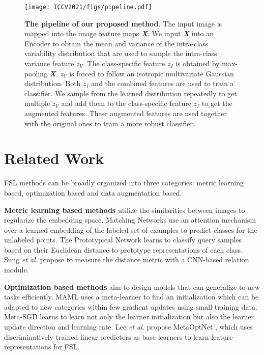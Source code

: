 \documentclass[10pt,twocolumn,letterpaper]{article}
\begin{document}
\begin{figure*}[!t]
  \centering
  \texttt{[image: ICCV2021/figs/pipeline.pdf]}\\
   \caption{\textbf{The pipeline of our proposed method}. The input image is mapped into the image feature maps \textbf{\textit{X}}. We input \textbf{\textit{X}} into an Encoder to obtain the mean and variance of the intra-class variability distribution that are used to sample the intra-class variance feature $z_V$. The class-specific feature $z_I$ is obtained by max-pooling \textbf{\textit{X}}. $z_V$ is forced to follow an isotropic multivariate Gaussian distribution. Both $z_I$ and the combined features are used to train a classifier.
We sample from the learned distribution repeatedly to get multiple $z_V$ and add them to the class-specific feature $z_I$ to get the augmented features.
These augmented features are used together with the original ones to train a more robust classifier.
  }
  \label{fig:pipeline}
\end{figure*}
\section{Related Work}

FSL methods can be broadly organized into three categories: metric learning based, optimization based and data augmentation based.
      
      \textbf{Metric learning based methods} \cite{matchingnet,protonet,relationnet,Ye2020FewShotLV,Yang2021FreeLF,Tian2020RethinkingFI,Zhang2020DeepEMDFI} utilize the similarities between images to regularize the embedding space. Matching Networks \cite{matchingnet} use an attention mechanism over a learned embedding of the labeled set of examples to predict classes for the unlabeled points.
The Prototypical Network \cite{protonet} learns to classify query samples based on their Euclidean distance to prototype representations of each class.
Sung \textit{et al.} \cite{relationnet} propose to measure the distance metric with a CNN-based relation module.


      \textbf{Optimization based methods} \cite{maml,metasgd,meta-opt,Lifchitz2019DenseCA,Santoro2016MetaLearningWM,Rajeswaran2019MetaLearningWI,Scott2018AdaptedDE} aim to design models that can generalize to new tasks efficiently.
MAML \cite{maml} uses a meta-learner to find an initialization which can be adapted to new categories within few gradient updates using small training data. 
Meta-SGD \cite{metasgd} learns to learn not only the learner initialization but also the learner update direction and learning rate.
Lee \textit{et al.} propose MetaOptNet \cite{meta-opt}, which uses discriminatively trained linear predictors as base learners to learn feature representations for FSL.
\end{document}
